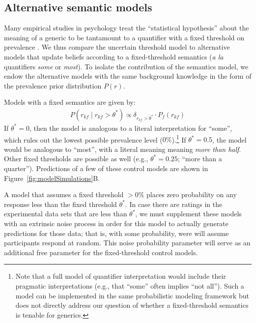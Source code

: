 \documentclass[floatsintext,doc]{apa6}
\let\rmarkdownfootnote\footnote%
\def\footnote{\protect\rmarkdownfootnote}
\begin{document}
\hypertarget{alternative-semantic-models}{%
\subsection{Alternative semantic models}\label{alternative-semantic-models}}

Many empirical studies in psychology treat the ``statistical hypothesis'' about the meaning of a generic to be tantamount to a quantifier with a fixed threshold on prevalence \cite{Prasada2006, Leslie2008, Cimpian2010, Khemlani2012, Prasada2013, Brandone2014}.
We thus compare the uncertain threshold model to alternative models that update beliefs according to a fixed-threshold semantics (\emph{a la} quantifiers \emph{some} or \emph{most}). 
To isolate the contribution of the semantics model,  we endow the alternative models with the same background knowledge in the form of the prevalence prior distribution \(P(r)\).

Models with a fixed semantics are given by:
\begin{eqnarray}
P (r_{kf} \mid r_{kf} >  \theta^*) \propto \delta_{r_{kf} > \theta^*} \cdot P_f(r_{kf})  \label{eq:L0fixed}
\end{eqnarray}
If $\theta^* = 0$, then the model is analogous to a literal interpretation for \enquote{some}, which rules out the lowest possible prevalence level ($0\%$).\footnote{Note that a full model of quantifier interpretation would include their pragmatic interpretations (e.g., that \enquote{some} often implies \enquote{not all}). Such a model can be implemented in the same probabilistic modeling framework \cite{Goodman2013} but does not directly address our question of whether a fixed-threshold semantics is tenable for generics.} 
If $\theta^* = 0.5$, the model would be analogous to \enquote{most}, with a literal meaning meaning \emph{more than half}. 
Other fixed thresholds are possible as well (e.g., $\theta^* = 0.25$; \enquote{more than a quarter}).
Predictions of a few of these control models are shown in Figure~\ref{fig:modelSimulations}B.

A model that assumes a fixed threshold $> 0\%$ places zero probability on any response less than the fixed threshold $\theta^*$.
In case there are ratings in the experimental data sets that are less than $\theta^*$, we must supplement these models with an extrinsic noise process in order for this model to actually generate predictions for those data; that is, with some probability, were will assume participants respond at random.
This noise probability parameter will serve as an additional free parameter for the fixed-threshold control models. 
\end{document}

